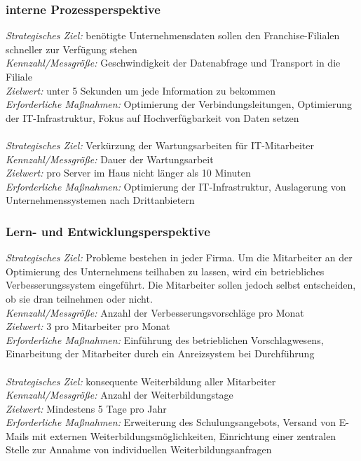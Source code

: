 \subsubsection{interne Prozessperspektive}
\emph{Strategisches Ziel:} benötigte Unternehmensdaten sollen den
Franchise-Filialen schneller zur Verfügung stehen\\
\emph{Kennzahl/Messgröße:} Geschwindigkeit der Datenabfrage und Transport in die
Filiale\\
\emph{Zielwert:} unter 5 Sekunden um jede Information zu bekommen \\
\emph{Erforderliche Maßnahmen:} Optimierung der Verbindungsleitungen,
Optimierung der IT-Infrastruktur, Fokus auf Hochverfügbarkeit von Daten
setzen\\\\
\emph{Strategisches Ziel:} Verkürzung der Wartungsarbeiten für IT-Mitarbeiter\\
\emph{Kennzahl/Messgröße:} Dauer der Wartungsarbeit\\
\emph{Zielwert:} pro Server im Haus nicht länger als 10 Minuten \\
\emph{Erforderliche Maßnahmen:} Optimierung der IT-Infrastruktur, Auslagerung
von Unternehmenssystemen nach Drittanbietern
\subsubsection{Lern- und Entwicklungsperspektive}
\emph{Strategisches Ziel:} Probleme bestehen in jeder Firma. Um die
Mitarbeiter an der Optimierung des Unternehmens teilhaben zu lassen, wird ein
betriebliches Verbesserungssystem eingeführt. Die Mitarbeiter sollen jedoch
selbst entscheiden, ob sie dran teilnehmen oder nicht.\\
\emph{Kennzahl/Messgröße:} Anzahl der Verbesserungsvorschläge pro Monat\\
\emph{Zielwert:} 3 pro Mitarbeiter pro Monat \\
\emph{Erforderliche Maßnahmen:} Einführung des betrieblichen
Vorschlagwesens, Einarbeitung der Mitarbeiter durch ein Anreizsystem bei
Durchführung\\\\
\emph{Strategisches Ziel:} konsequente Weiterbildung aller Mitarbeiter\\
\emph{Kennzahl/Messgröße:} Anzahl der Weiterbildungstage\\
\emph{Zielwert:} Mindestens 5 Tage pro Jahr \\
\emph{Erforderliche Maßnahmen:} Erweiterung des Schulungsangebots, Versand von
E-Mails mit externen Weiterbildungsmöglichkeiten, Einrichtung einer zentralen
Stelle zur Annahme von individuellen Weiterbildungsanfragen
